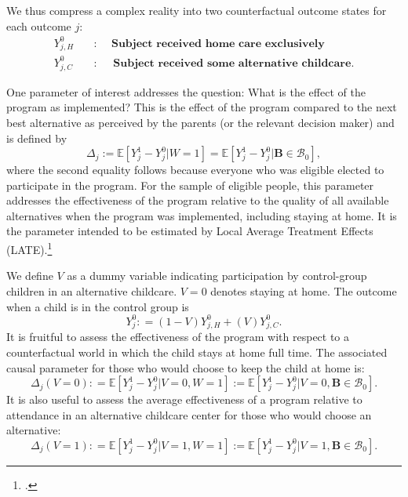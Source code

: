 We thus compress a complex reality into two counterfactual outcome states for each outcome $j$:
\begin{align*}
Y_{j,H}^0 \quad &: \quad \textbf{ Subject received home care exclusively} \\
Y_{j,C}^0 \quad &: \quad \textbf{ Subject received some alternative childcare}.
\end{align*}


One parameter of interest addresses the question: What is the effect of the program as implemented? This is the effect of the program compared to the next best alternative as perceived by the parents (or the relevant decision maker) and is defined by
\begin{equation}\label{eq:effect}
\Delta_j := \mathbb{E} \left[ Y_{j}^1 -  Y_{j}^0 | W =1 \right] = \mathbb{E} \left[Y_{j}^1 -  Y_{j}^0 | \bm{B} \in \mathcal{B}_0 \right],
\end{equation}
where the second equality follows because everyone who was eligible elected to participate in the program. For the sample of eligible people, this parameter addresses the effectiveness of the program relative to the quality of all available alternatives when the program was implemented, including staying at home. It is the parameter intended to be estimated by Local Average Treatment Effects (LATE).\footnote{\citet{Imbens_Angrist_1994_Econometrica}.}

We define $V$ as a dummy variable indicating participation by control-group children in an alternative childcare. $V=0$ denotes staying at home. The outcome when a child is in the control group is
\begin{equation}
Y_{j}^0 : = \left( 1 - V \right) Y_{j,H}^0 + \left( V \right) Y_{j,C}^0. \label{eq:meandiff}
\end{equation}
\noindent It is fruitful to assess the effectiveness of the program with respect to a counterfactual world in which the child stays at home full time. The associated causal parameter for those who would choose to keep the child at home is:
\begin{equation}\label{eq:cont1}
\Delta_j \left(V = 0 \right) : =   \mathbb{E} \left[ Y_{j}^1 -  Y_{j}^0 | V = 0, W = 1 \right] := \mathbb{E} \left[Y_{j}^1 -  Y_{j}^0 | V = 0, \bm{B} \in \mathcal{B}_0 \right].
\end{equation}
It is also useful to assess the average effectiveness of a program relative to attendance in an alternative childcare center for those who would choose an alternative:
\begin{equation}\label{eq:cont2}
\Delta_j \left( V =1 \right) : =   \mathbb{E} \left[ Y_{j}^1 -  Y_{j}^0 | V = 1, W = 1 \right] := \mathbb{E} \left[ Y_{j}^1 -  Y_{j}^0 | V = 1, \bm{B} \in \mathcal{B}_0 \right].
\end{equation}


